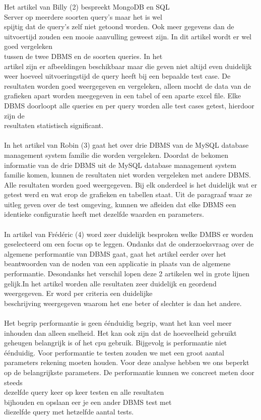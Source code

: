 \documentclass[fleqn,10pt]{artikeltin}
\begin{document}
Het artikel van Billy (2) bespreekt MongoDB en SQL \\Server op meerdere soorten query’s maar het is wel \\spijtig dat de query’s zelf niet getoond worden. Ook meer gegevens dan de uitvoertijd zouden een mooie aanvulling geweest zijn. In dit artikel wordt er wel goed vergeleken \\tussen de twee DBMS en de soorten queries. In het \\artikel zijn er afbeeldingen beschikbaar maar die geven niet altijd even duidelijk weer hoeveel uitvoeringstijd de query heeft bij een bepaalde test case. De resultaten worden goed weergegeven en vergeleken, alleen mocht de data van de \\grafieken apart worden meegegeven in een tabel of een aparte excel file. Elke DBMS doorloopt alle queries en per query worden alle test cases getest, hierdoor zijn de \\resultaten statistisch significant.\\\\
In het artikel van Robin (3) gaat het over drie DBMS van de MySQL database management system familie die worden vergeleken. Doordat de bekomen informatie van de drie DBMS uit de MySQL database management system familie komen, kunnen de resultaten niet worden vergeleken met andere DBMS. Alle resultaten worden goed weergegeven. Bij elk onderdeel is het duidelijk wat er getest werd en wat erop de grafieken en tabellen staat. Uit de paragraaf waar ze uitleg geven over de test omgeving, kunnen we afleiden dat elke DBMS een identieke configuratie heeft met dezelfde waarden en parameters.\\\\
In artikel van Frédéric (4) word zeer duidelijk besproken welke DMBS er worden geselecteerd om een focus op te leggen. Ondanks dat de onderzoeksvraag over de algemene performantie van DBMS gaat, gaat het artikel eerder over het beantwoorden van de noden van een applicatie in plaats van de algemene performantie. Desondanks het verschil lopen deze 2 artikelen wel in grote lijnen gelijk.In het artikel worden alle resultaten zeer duidelijk en geordend \\weergegeven. Er word per criteria een duidelijke \\beschrijving weergegeven waarom het ene beter of slechter is dan het andere.\\\\
Het begrip performantie is geen éénduidig begrip, want het kan veel meer inhouden dan alleen snelheid. Het kan ook zijn dat de hoeveelheid gebruikt geheugen belangrijk is of het cpu gebruik. Bijgevolg is performantie niet éénduidig. Voor performantie te testen zouden we met een groot aantal parameters rekening moeten houden. Voor deze analyse hebben we ons beperkt op de belangrijkste parameters. De performantie kunnen we concreet meten door steeds \\dezelfde query keer op keer testen en alle resultaten \\bijhouden en opslaan eer je een ander DBMS test met \\diezelfde query met hetzelfde aantal tests.
\end{document}
